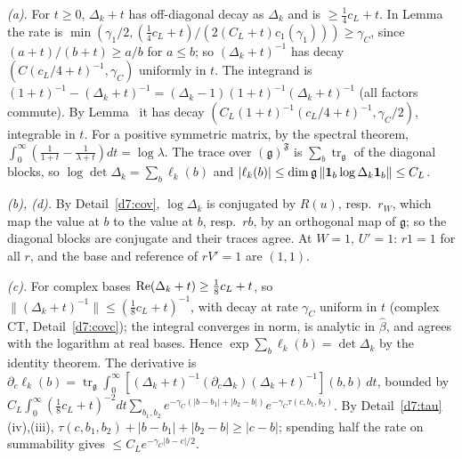 \begin{detail}\label{d7:det}
\begin{step}
\emph{(a).} For $t\ge0$, $\Delta_k+t$ has off-diagonal decay as $\Delta_k$ and is $\ge\frac14c_L+t$. In Lemma~ the rate is $\min(\gamma_1/2,(\frac14c_L+t)/(2(C_L+t)c_1(\gamma_1)))\ge\gamma_C$, since $(a+t)/(b+t)\ge a/b$ for $a\le b$; so $(\Delta_k+t)^{-1}$ has decay $(C(c_L/4+t)^{-1},\gamma_C)$ uniformly in $t$. The integrand is $(1+t)^{-1}-(\Delta_k+t)^{-1}=(\Delta_k-1)(1+t)^{-1}(\Delta_k+t)^{-1}$ (all factors commute). By Lemma~ it has decay $(C_L(1+t)^{-1}(c_L/4+t)^{-1},\gamma_C/2)$, integrable in $t$. For a positive symmetric matrix, by the spectral theorem, $\int_0^\infty(\frac1{1+t}-\frac1{\lambda+t})dt=\log\lambda$. The trace over $(\mathfrak g)^{\mathfrak F}$ is $\sum_{b}\operatorname{tr}_{\mathfrak g}$ of the diagonal blocks, so $\log\det\Delta_k=\sum_b\ell_k(b)$ and $|\ell_k(b)|\le\dim\mathfrak g\,\|\mathbf 1_b\log\Delta_k\mathbf 1_b\|\le C_L$.
\end{step}
\begin{step}
\emph{(b), (d).} By Detail~\ref{d7:cov}, $\log\Delta_k$ is conjugated by $R(u)$, resp.\ $r_W$, which map the value at $b$ to the value at $b$, resp.\ $rb$, by an orthogonal map of $\mathfrak g$; so the diagonal blocks are conjugate and their traces agree. At $W=1$, $U'=1$: $r1=1$ for all $r$, and the base and reference of $rV'=1$ are $(1,1)$.
\end{step}
\begin{step}
\emph{(c).} For complex bases $\operatorname{Re}(\Delta_k+t)\ge\frac18c_L+t$, so $\|(\Delta_k+t)^{-1}\|\le(\frac18c_L+t)^{-1}$, with decay at rate $\gamma_C$ uniform in $t$ (complex CT, Detail~\ref{d7:covc}); the integral converges in norm, is analytic in $\hat\beta$, and agrees with the logarithm at real bases. Hence $\exp\sum_b\ell_k(b)=\det\Delta_k$ by the identity theorem. The derivative is $\partial_c\ell_k(b)=\operatorname{tr}_{\mathfrak g}\int_0^\infty[(\Delta_k+t)^{-1}(\partial_c\Delta_k)(\Delta_k+t)^{-1}](b,b)\,dt$, bounded by $C_L\int_0^\infty(\frac18c_L+t)^{-2}dt\sum_{b_1,b_2}e^{-\gamma_C(|b-b_1|+|b_2-b|)}e^{-\gamma_C\tau(c,b_1,b_2)}$. By Detail~\ref{d7:tau}(iv),(iii), $\tau(c,b_1,b_2)+|b-b_1|+|b_2-b|\ge|c-b|$; spending half the rate on summability gives $\le C_Le^{-\gamma_C|b-c|/2}$.
\end{step}
\end{detail}

